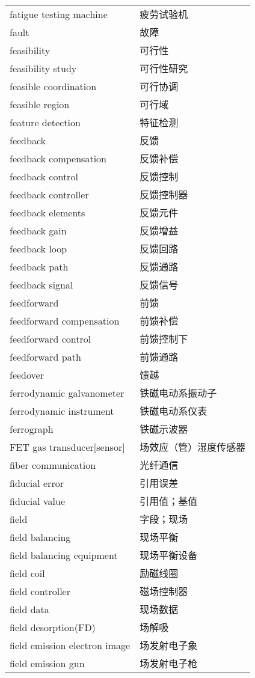 \documentclass[
]{article}
\begin{document}
\begin{longtable}[]{@{}ll@{}}
fatigue testing machine & 疲劳试验机 \\
fault & 故障 \\
feasibility & 可行性 \\
feasibility study & 可行性研究 \\
feasible coordination & 可行协调 \\
feasible region & 可行域 \\
feature detection & 特征检测 \\
feedback & 反馈 \\
feedback compensation & 反馈补偿 \\
feedback control & 反馈控制 \\
feedback controller & 反馈控制器 \\
feedback elements & 反馈元件 \\
feedback gain & 反馈增益 \\
feedback loop & 反馈回路 \\
feedback path & 反馈通路 \\
feedback signal & 反馈信号 \\
feedforward & 前馈 \\
feedforward compensation & 前馈补偿 \\
feedforward control & 前馈控制下 \\
feedforward path & 前馈通路 \\
feedover & 馈越 \\
ferrodynamic galvanometer & 铁磁电动系振动子 \\
ferrodynamic instrument & 铁磁电动系仪表 \\
ferrograph & 铁磁示波器 \\
FET gas transducer{[}sensor{]} & 场效应（管）湿度传感器 \\
fiber communication & 光纤通信 \\
fiducial error & 引用误差 \\
fiducial value & 引用值；基值 \\
field & 字段；现场 \\
field balancing & 现场平衡 \\
field balancing equipment & 现场平衡设备 \\
field coil & 励磁线圈 \\
field controller & 磁场控制器 \\
field data & 现场数据 \\
field desorption(FD) & 场解吸 \\
field emission electron image & 场发射电子象 \\
field emission gun & 场发射电子枪 \\

\end{longtable}
\end{document}
